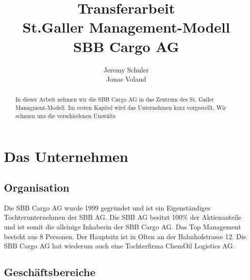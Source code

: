 \documentclass{article}
\title{
    Transferarbeit
    \\St.Galler Management-Modell
    \\SBB Cargo AG}
\author{
    Jeremy Schuler\\
    Jonas Voland
}
\begin{document}
\begin{titlepage}
    \maketitle
\end{titlepage}

\setcounter{page}{2}

\begin{abstract}
    In dieser Arbeit nehmen wir die SBB Cargo AG in das Zentrum des St. Galler Managment-Modell.
    Im ersten Kapitel wird das Unternehmen kurz vorgestellt.
    Wir schauen uns die verschiedenen Umwälts
\end{abstract}

\tableofcontents

\newpage

\section{Das Unternehmen}

\subsection{Organisation}

Die SBB Cargo AG wurde 1999 gegründet und ist ein Eigenständiges Tochterunternehmen der SBB AG.
Die SBB AG besitzt 100\% der Aktienanteile und ist somit die alleinige Inhaberin der SBB Cargo AG.
Das Top Management besteht aus 8 Personen.
Der Hauptsitz ist in Olten an der Bahnhofstrasse 12.
Die SBB Cargo AG hat wiederum auch eine Tochterfirma ChemOil Logistics AG. \cite{test}

\subsection{Geschäftsbereiche}

\newpage

\printbibliography
\end{document}
